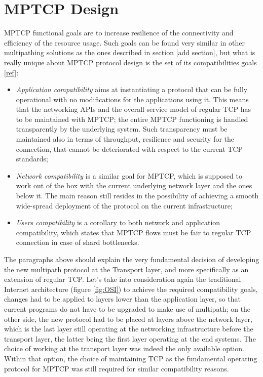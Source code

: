 \section{MPTCP Design}
MPTCP functional goals are to increase resilience of the connectivity and efficiency of the resource usage.
Such goals can be found very similar in other multipathing solutions as the ones described in section [add section], but what is really unique about MPTCP protocol design is the set of its compatibilities goals [\href{https://tools.ietf.org/html/rfc6182}{ref}]:

\begin{itemize}
  \item \textit{Application compatibility} aims at instantiating a protocol that can be fully operational with no modifications for the applications using it. This means that the networking APIs and the overall service model of regular TCP has to be maintained with MPTCP; the entire MPTCP functioning is handled transparently by the underlying system. Such transparency must be maintained also in terms of throughput, resilience and security for the connection, that cannot be deteriorated with respect to the current TCP standards;
  \item \textit{Network compatibility} is a similar goal for MPTCP, which is supposed to work out of the box with the current underlying network layer and the ones below it. The main reason still resides in the possibility of achieving a smooth wide-spread deployment of the protocol on the current infrastructure;
  \item \textit{Users compatibility} is a corollary to both network and application compatibility, which states that MPTCP flows must be fair to regular TCP connection in case of shard bottlenecks.
\end{itemize}


The paragraphs above should explain the very fundamental decision of developing the new multipath protocol at the Transport layer, and more specifically as an extension of regular TCP. Let's take into consideration again the traditional Internet architecture (figure \ref{fig:OSI}) to achieve the required compatibility goals, changes had to be applied to layers lower than the application layer, so that current programs do not have to be upgraded to make use of multipath; on the other side, the new protocol had to be placed at layers above the network layer, which is the last layer still operating at the networking infrastructure before the transport layer, the latter being the first layer operating at the end systems. The choice of working at the transport layer was indeed the only available option. Within that option, the choice of maintaining TCP as the fundamental operating protocol for MPTCP was still required for similar compatibility reasons.


